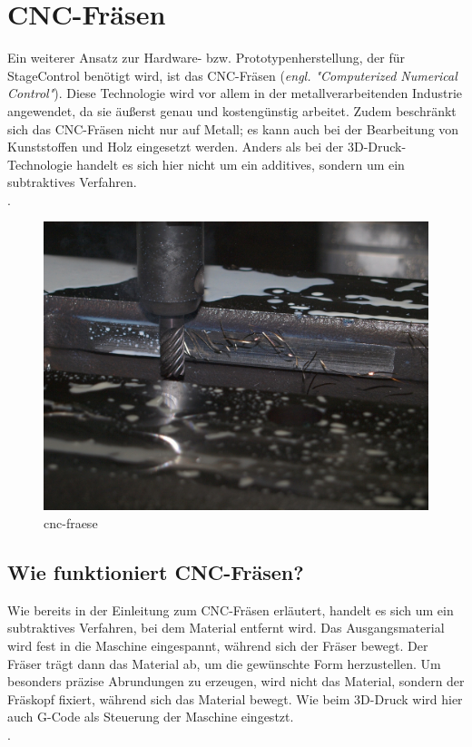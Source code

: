 \section{CNC-Fräsen}

Ein weiterer Ansatz zur Hardware- bzw. Prototypenherstellung, der für StageControl benötigt wird, ist das CNC-Fräsen (\emph{engl. "Computerized Numerical Control"}). Diese Technologie wird vor allem in der metallverarbeitenden Industrie angewendet, da sie äußerst genau und kostengünstig arbeitet. Zudem beschränkt sich das CNC-Fräsen nicht nur auf Metall; es kann auch bei der Bearbeitung von Kunststoffen und Holz eingesetzt werden. Anders als bei der 3D-Druck-Technologie handelt es sich hier nicht um ein additives, sondern um ein subtraktives Verfahren.\\
 \cite{CNC-Fraesen} \cite{CNC-Fraesen_2} \cite{CNC-Fraesen_3}.


\begin{figure}[H]
	\centering
	\includegraphics[width=1\linewidth]{images/CNC.jpg}
	\caption[cnc-fraese]{cnc-fraese}
	\label{fig:cnc-fraese}
\end{figure}

\subsection{Wie funktioniert CNC-Fräsen?}
Wie bereits in der Einleitung zum CNC-Fräsen erläutert, handelt es sich um ein subtraktives Verfahren, bei dem Material entfernt wird. Das Ausgangsmaterial wird fest in die Maschine eingespannt, während sich der Fräser bewegt. Der Fräser trägt dann das Material ab, um die gewünschte Form herzustellen. Um besonders präzise Abrundungen zu erzeugen, wird nicht das Material, sondern der Fräskopf fixiert, während sich das Material bewegt. Wie beim 3D-Druck wird hier auch G-Code als Steuerung der Maschine eingestzt. \\
\cite{CNC-Fraesen_2} \cite{CNC-Fraesen_3}.


